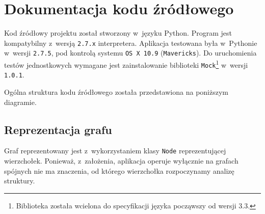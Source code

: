 \documentclass[a4paper,10pt]{article}
\begin{document}
\pagebreak

\section*{Dokumentacja kodu źródłowego}

Kod źródłowy projektu został stworzony w~języku Python. Program jest kompatybilny z~wersją \verb+2.7.x+ interpretera. Aplikacja testowana była w~Pythonie w~wersji \verb+2.7.5+, pod kontrolą systemu \verb+OS X 10.9+ (\verb+Mavericks+). Do uruchomienia testów jednostkowych wymagane jest zainstalowanie biblioteki \verb+Mock+\footnote{Biblioteka została wcielona do specyfikacji języka począwszy od wersji 3.3.} w~wersji \verb+1.0.1+.

Ogólna struktura kodu źródłowego została przedstawiona na poniższym diagramie.

 
\subsection*{Reprezentacja grafu}

Graf reprezentowany jest z~wykorzystaniem klasy \verb+Node+ reprezentującej wierzchołek. Ponieważ, z~założenia, aplikacja operuje wyłącznie na grafach spójnych nie ma znaczenia, od którego wierzchołka rozpoczynamy analizę struktury.
\end{document}
